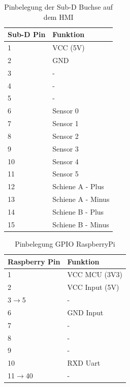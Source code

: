 \documentclass[a4paper, 11pt]{report}
\begin{document}
	\begin{table}[H]
	\centering
		\caption{Pinbelegung der Sub-D Buchse auf dem HMI}
		\begin{tabular}{|l|l|}
			\hline
			\textbf{Sub-D Pin} &\textbf{Funktion}\\
			\hline
			\hline
			1 & VCC (5V)\\
			\hline
			2 & GND\\
			\hline
			3 & -\\
			\hline
			4 & -\\
			\hline
			5 & -\\
			\hline
			6 & Sensor 0\\
			\hline
			7 & Sensor 1\\
			\hline
			8 & Sensor 2\\
			\hline
			9 & Sensor 3\\
			\hline
			10 & Sensor 4\\
			\hline
			11 & Sensor 5\\
			\hline
			12 & Schiene A - Plus\\
			\hline
			13 & Schiene A - Minus\\
			\hline
			14 & Schiene B - Plus\\
			\hline
			15 & Schiene B - Minus\\
			\hline
		\end{tabular}
		\label{tab:AnhangBelegungSUBD}
	\end{table}

	\begin{table}[H]
	\centering
		\caption{Pinbelegung GPIO RaspberryPi}
		\begin{tabular}{|l|l|}
			\hline
			\textbf{Raspberry Pin} &\textbf{Funktion}\\
			\hline
			\hline
			1 & VCC MCU (3V3)\\
			\hline
			2 & VCC Input (5V)\\
			\hline
			3$\rightarrow$5 & -\\
			\hline
			6 & GND Input\\
			\hline
			7 & -\\
			\hline
			8 & -\\
			\hline
			9 & -\\
			\hline
			10 & RXD Uart\\
			\hline
			11$\rightarrow$40 & -\\
			\hline
		\end{tabular}
		
		\label{tab:AnhangBelegungRPI}
	\end{table}
\end{document}
